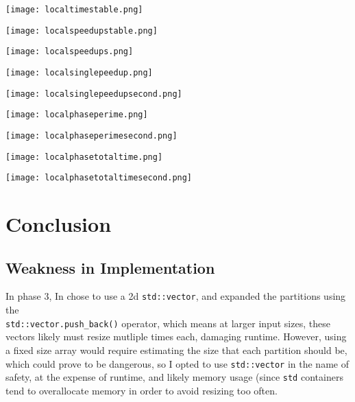 \documentclass[11pt]{report}
\newcommand{\SCALE}{0.5}
\begin{document}
\begin{minipage}{\SCALE\linewidth}
\texttt{[image: localtimestable.png]}
\end{minipage}
\hfill
\begin{minipage}{\SCALE\linewidth}
\texttt{[image: localspeedupstable.png]}
\end{minipage}

\begin{minipage}{\SCALE\linewidth}
\texttt{[image: localspeedups.png]}
\end{minipage}
\hfill
\begin{minipage}{\SCALE\linewidth}
\texttt{[image: localsinglepeedup.png]}
\end{minipage}

\begin{minipage}{\SCALE\linewidth}
\texttt{[image: localsinglepeedupsecond.png]}
\end{minipage}

\begin{minipage}{\SCALE\linewidth}
\texttt{[image: localphaseperime.png]}
\end{minipage}
\hfill
\begin{minipage}{\SCALE\linewidth}
\texttt{[image: localphaseperimesecond.png]}
\end{minipage}

\begin{minipage}{\SCALE\linewidth}
\texttt{[image: localphasetotaltime.png]}
\end{minipage}
\hfill
\begin{minipage}{\SCALE\linewidth}
\texttt{[image: localphasetotaltimesecond.png]}
\end{minipage}

\section*{Conclusion}

\subsection*{Weakness in Implementation}
In phase 3, In chose to use a 2d \verb|std::vector|, and expanded the partitions using the \\ \verb|std::vector.push_back()| operator, which means at larger input sizes, these vectors likely must resize mutliple times each, damaging runtime. However, using a fixed size array would require estimating the size that each partition should be, which could prove to be dangerous, so I opted to use \verb|std::vector| in the name of safety, at the expense of runtime, and likely memory usage (since \verb|std| containers tend to overallocate memory in order to avoid resizing too often.
\end{document}
